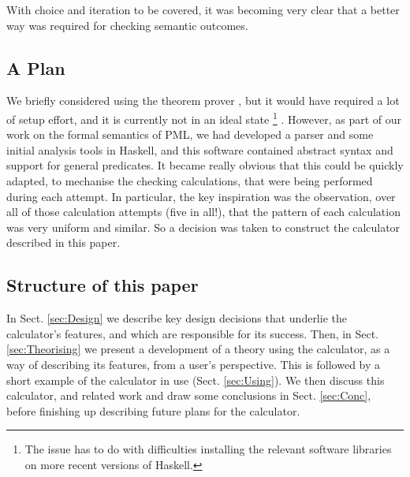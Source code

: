With choice and iteration to be covered,
it was becoming very clear that a better way was required
for checking semantic outcomes.

\subsection{A Plan}\label{ssec:plan}

We briefly considered using the  theorem prover
\cite{DBLP:conf/utp/Butterfield10,DBLP:conf/utp/Butterfield12},
but it would have required a lot of setup effort,
and it is currently not in an ideal state%
\footnote{The issue has to do with difficulties installing
the relevant software libraries
on more recent versions of Haskell.}
.
However, as part of our work on the formal semantics of PML,
we had developed a parser and some initial analysis tools
in Haskell\cite{Haskell2010},
and this software contained abstract syntax and support
for general predicates.
It became really obvious that this could be quickly adapted,
to mechanise the checking calculations, that were being performed
during each attempt.
In particular,
the key inspiration was the observation,
over all of those calculation attempts (five in all!),
that the pattern of each calculation was very uniform and similar.
So a decision was taken to construct the calculator described in this paper.



\subsection{Structure of this paper}

In Sect. \ref{sec:Design}
we describe key design decisions
that underlie the calculator's features,
and which are responsible for its success.
Then, in Sect. \ref{sec:Theorising}
we present a development of a theory using the calculator,
as a way of describing its features, from a user's perspective.
This is followed by a short example of the calculator in use
(Sect. \ref{sec:Using}).
We then discuss this calculator, and related work
and draw some conclusions in Sect. \ref{sec:Conc},
before finishing up describing future plans for the calculator.
